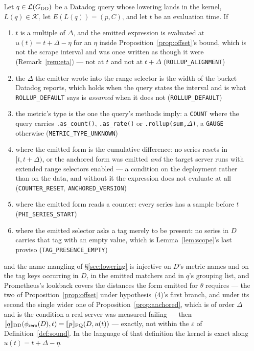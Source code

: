 \begin{theorem}\label{thm:kernel}
Let $q\in\mathcal{L}(G_{\mathrm{DD}})$ be a Datadog query whose lowering lands in the
kernel, $L(q)\in\mathcal{K}$, let $E(L(q))=(p,C)$, and let $t$ be an evaluation time. If
\begin{enumerate}
\item $t$ is a multiple of $\Delta$, and the emitted expression is evaluated at
      $u(t)=t+\Delta-\eta$ for an $\eta$ inside Proposition~\ref{prop:offset}'s bound,
      which is not the scrape interval and was once written as though it were
      (Remark~\ref{rem:eta})
      --- not at $t$ and not at $t+\Delta$
      \hfill (\texttt{ROLLUP\_ALIGNMENT})
\item the $\Delta$ the emitter wrote into the range selector is the width of the bucket
      Datadog reports, which holds when the query states the interval and is what
      \texttt{ROLLUP\_DEFAULT} says is \emph{assumed} when it does not
      \hfill (\texttt{ROLLUP\_DEFAULT})
\item the metric's type is the one the query's methods imply: a \texttt{COUNT} where the
      query carries \texttt{.as\_count()}, \texttt{.as\_rate()} or
      \texttt{.rollup(sum,$\Delta$)}, a \texttt{GAUGE} otherwise
      \hfill (\texttt{METRIC\_TYPE\_UNKNOWN})
\item where the emitted form is the cumulative difference: no series resets in
      $[t,t+\Delta)$, or the anchored form was emitted \emph{and} the target server runs
      with extended range selectors enabled --- a condition on the deployment rather
      than on the data, and without it the expression does not evaluate at all
      \hfill (\texttt{COUNTER\_RESET}, \texttt{ANCHORED\_VERSION})
\item where the emitted form reads a counter: every series has a sample before $t$
      \hfill (\texttt{PHI\_SERIES\_START})
\item where the emitted selector asks a tag merely to be present: no series in $D$
      carries that tag with an empty value, which is Lemma~\ref{lem:scope}'s last
      proviso
      \hfill (\texttt{TAG\_PRESENCE\_EMPTY})
\end{enumerate}
and the name mangling of \S\ref{sec:lowering} is injective on $D$'s metric names and on
the tag keys occurring in $D$, in the emitted matchers and in $q$'s grouping list, and
Prometheus's lookback covers the distances the
form emitted for $\theta$ requires --- the two of
Proposition~\ref{prop:offset} under hypothesis~(4)'s first branch, and under its second
the single wider one of Proposition~\ref{prop:anchored}, which is of order $\Delta$ and
is the condition a real server was measured failing --- then
$\llbracket q \rrbracket_{\mathrm{DD}}(\phi_{\mathsf{zero}}(D),t)=\llbracket p \rrbracket_{\mathrm{PQ}}(D,u(t))$ ---
exactly, not within the $\varepsilon$ of Definition~\ref{def:sound}. In the language of
that definition the kernel is exact along $u(t)=t+\Delta-\eta$.
\end{theorem}

